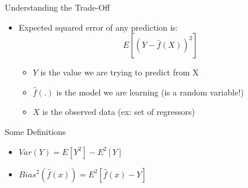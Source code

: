\documentclass[aspectratio=169]{beamer}
\begin{document}
\begin{frame}{Understanding the Trade-Off}

\begin{itemize}
\item Expected squared error of any prediction is:
	 $$E[(Y - \hat{f}(X))^2]$$ 
	\begin{itemize}
	\item $Y$ is the value we are trying to predict from X
	\item $\hat{f}(.)$ is the model we are learning (is a random variable!)
	\item $X$ is the observed data (ex: set of regressors)
	\end{itemize}
\end{itemize}
\end{frame}

\begin{frame}{Some Definitions}

\begin{itemize}
\item $Var(Y) = E[Y^2] - E^2[Y]$
\item $Bias^2(\hat{f}(x)) = E^2[\hat{f}(x) - Y]$
\end{itemize}
\end{frame}
\end{document}
